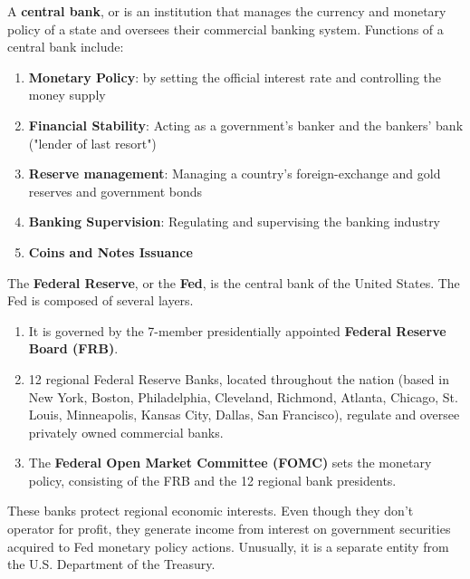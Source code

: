 \documentclass{article}
\begin{document}
      \begin{definition}
        A \textbf{central bank}, or  is an institution that manages the currency and monetary policy of a state and oversees their commercial banking system. Functions of a central bank include: 
        \begin{enumerate}
          \item \textbf{Monetary Policy}: by setting the official interest rate and controlling the money supply 
          \item \textbf{Financial Stability}: Acting as a government's banker and the bankers' bank ("lender of last resort") 
          \item \textbf{Reserve management}: Managing a country's foreign-exchange and gold reserves and government bonds
          \item \textbf{Banking Supervision}: Regulating and supervising the banking industry
          \item \textbf{Coins and Notes Issuance}
        \end{enumerate}
      \end{definition}

      \begin{definition}
        The \textbf{Federal Reserve}, or the \textbf{Fed}, is the central bank of the United States. The Fed is composed of several layers. 
        \begin{enumerate}
          \item It is governed by the 7-member presidentially appointed \textbf{Federal Reserve Board (FRB)}. 
          \item 12 regional Federal Reserve Banks, located throughout the nation (based in New York, Boston, Philadelphia, Cleveland, Richmond, Atlanta, Chicago, St. Louis, Minneapolis, Kansas City, Dallas, San Francisco), regulate and oversee privately owned commercial banks. 
          \item The \textbf{Federal Open Market Committee (FOMC)} sets the monetary policy, consisting of the FRB and the 12 regional bank presidents. 
        \end{enumerate}
        These banks protect regional economic interests. Even though they don't operator for profit, they generate income from interest on government securities acquired to Fed monetary policy actions. Unusually, it is a separate entity from the U.S. Department of the Treasury. 
      \end{definition}
\end{document}
